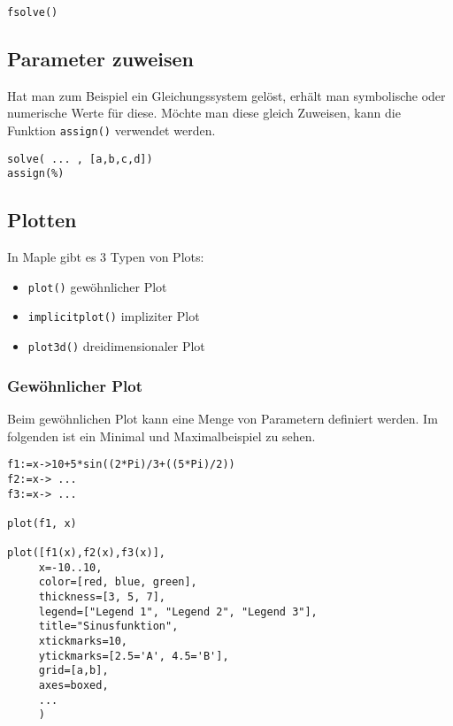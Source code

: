 \documentclass[a4paper,
               10pt,
               fleqn]{article}
\begin{document}
\begin{lstlisting}[caption=Gleichung numerisch, label=Gleichung numerisch]
fsolve()
\end{lstlisting}

\subsection{Parameter zuweisen}
Hat man zum Beispiel ein Gleichungssystem gelöst, erhält man symbolische oder
numerische Werte für diese. Möchte man diese gleich Zuweisen, kann die Funktion
\verb!assign()! verwendet werden.

\begin{lstlisting}[caption=Parameter zuweisen, label=Parameter zuweisen]
solve( ... , [a,b,c,d])
assign(%)
\end{lstlisting}

\subsection{Plotten}
In Maple gibt es 3 Typen von Plots:
\begin{itemize}
	\item \verb!plot()! \hfill gewöhnlicher Plot
	\item \verb!implicitplot()! \hfill impliziter Plot
	\item \verb!plot3d()! \hfill dreidimensionaler Plot
\end{itemize}

\subsubsection{Gewöhnlicher Plot}
Beim gewöhnlichen Plot kann eine Menge von Parametern definiert werden.
Im folgenden ist ein Minimal und Maximalbeispiel zu sehen.

\begin{lstlisting}[caption=Plot, label=Plot]
f1:=x->10+5*sin((2*Pi)/3+((5*Pi)/2))
f2:=x-> ... 
f3:=x-> ...

plot(f1, x)

plot([f1(x),f2(x),f3(x)], 
     x=-10..10,
     color=[red, blue, green],
     thickness=[3, 5, 7],
     legend=["Legend 1", "Legend 2", "Legend 3"],
     title="Sinusfunktion",
     xtickmarks=10,
     ytickmarks=[2.5='A', 4.5='B'],
     grid=[a,b],
     axes=boxed,
     ...
     )


\end{lstlisting}

\lstlistoflistings
\end{document}
